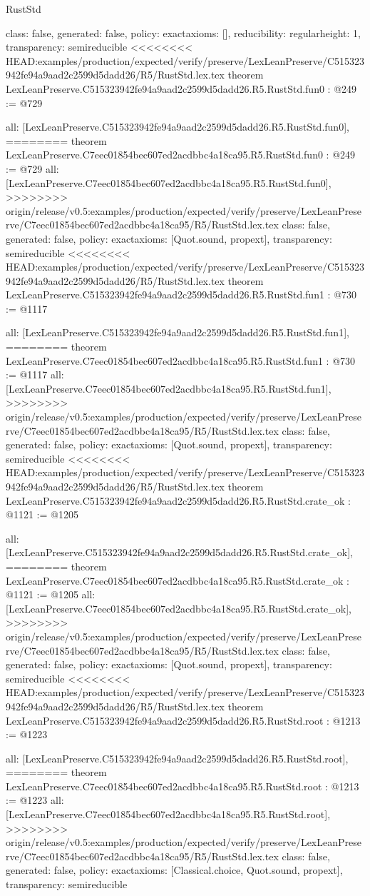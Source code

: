 \begin{lexlean}{RustStd}
\begin{coremodule}
{\begin{coremodule}
{{{  class: false,
  generated: false,
  policy: exact{axioms: []},
  reducibility: regular{height: 1},
  transparency: semireducible
}
<<<<<<<< HEAD:examples/production/expected/verify/preserve/LexLeanPreserve/C515323942fe94a9aad2c2599d5dadd26/R5/RustStd.lex.tex
theorem LexLeanPreserve.C515323942fe94a9aad2c2599d5dadd26.R5.RustStd.fun0 : @249 := @729 {
  all: [LexLeanPreserve.C515323942fe94a9aad2c2599d5dadd26.R5.RustStd.fun0],
========
theorem LexLeanPreserve.C7eec01854bec607ed2acdbbc4a18ca95.R5.RustStd.fun0 : @249 := @729 {
  all: [LexLeanPreserve.C7eec01854bec607ed2acdbbc4a18ca95.R5.RustStd.fun0],
>>>>>>>> origin/release/v0.5:examples/production/expected/verify/preserve/LexLeanPreserve/C7eec01854bec607ed2acdbbc4a18ca95/R5/RustStd.lex.tex
  class: false,
  generated: false,
  policy: exact{axioms: [Quot.sound, propext]},
  transparency: semireducible
}
<<<<<<<< HEAD:examples/production/expected/verify/preserve/LexLeanPreserve/C515323942fe94a9aad2c2599d5dadd26/R5/RustStd.lex.tex
theorem LexLeanPreserve.C515323942fe94a9aad2c2599d5dadd26.R5.RustStd.fun1 : @730 := @1117 {
  all: [LexLeanPreserve.C515323942fe94a9aad2c2599d5dadd26.R5.RustStd.fun1],
========
theorem LexLeanPreserve.C7eec01854bec607ed2acdbbc4a18ca95.R5.RustStd.fun1 : @730 := @1117 {
  all: [LexLeanPreserve.C7eec01854bec607ed2acdbbc4a18ca95.R5.RustStd.fun1],
>>>>>>>> origin/release/v0.5:examples/production/expected/verify/preserve/LexLeanPreserve/C7eec01854bec607ed2acdbbc4a18ca95/R5/RustStd.lex.tex
  class: false,
  generated: false,
  policy: exact{axioms: [Quot.sound, propext]},
  transparency: semireducible
}
<<<<<<<< HEAD:examples/production/expected/verify/preserve/LexLeanPreserve/C515323942fe94a9aad2c2599d5dadd26/R5/RustStd.lex.tex
theorem LexLeanPreserve.C515323942fe94a9aad2c2599d5dadd26.R5.RustStd.crate_ok : @1121 := @1205 {
  all: [LexLeanPreserve.C515323942fe94a9aad2c2599d5dadd26.R5.RustStd.crate_ok],
========
theorem LexLeanPreserve.C7eec01854bec607ed2acdbbc4a18ca95.R5.RustStd.crate_ok : @1121 := @1205 {
  all: [LexLeanPreserve.C7eec01854bec607ed2acdbbc4a18ca95.R5.RustStd.crate_ok],
>>>>>>>> origin/release/v0.5:examples/production/expected/verify/preserve/LexLeanPreserve/C7eec01854bec607ed2acdbbc4a18ca95/R5/RustStd.lex.tex
  class: false,
  generated: false,
  policy: exact{axioms: [Quot.sound, propext]},
  transparency: semireducible
}
<<<<<<<< HEAD:examples/production/expected/verify/preserve/LexLeanPreserve/C515323942fe94a9aad2c2599d5dadd26/R5/RustStd.lex.tex
theorem LexLeanPreserve.C515323942fe94a9aad2c2599d5dadd26.R5.RustStd.root : @1213 := @1223 {
  all: [LexLeanPreserve.C515323942fe94a9aad2c2599d5dadd26.R5.RustStd.root],
========
theorem LexLeanPreserve.C7eec01854bec607ed2acdbbc4a18ca95.R5.RustStd.root : @1213 := @1223 {
  all: [LexLeanPreserve.C7eec01854bec607ed2acdbbc4a18ca95.R5.RustStd.root],
>>>>>>>> origin/release/v0.5:examples/production/expected/verify/preserve/LexLeanPreserve/C7eec01854bec607ed2acdbbc4a18ca95/R5/RustStd.lex.tex
  class: false,
  generated: false,
  policy: exact{axioms: [Classical.choice, Quot.sound, propext]},
  transparency: semireducible
}

}}}}}}
\end{coremodule}}
\end{coremodule}
\end{lexlean}
